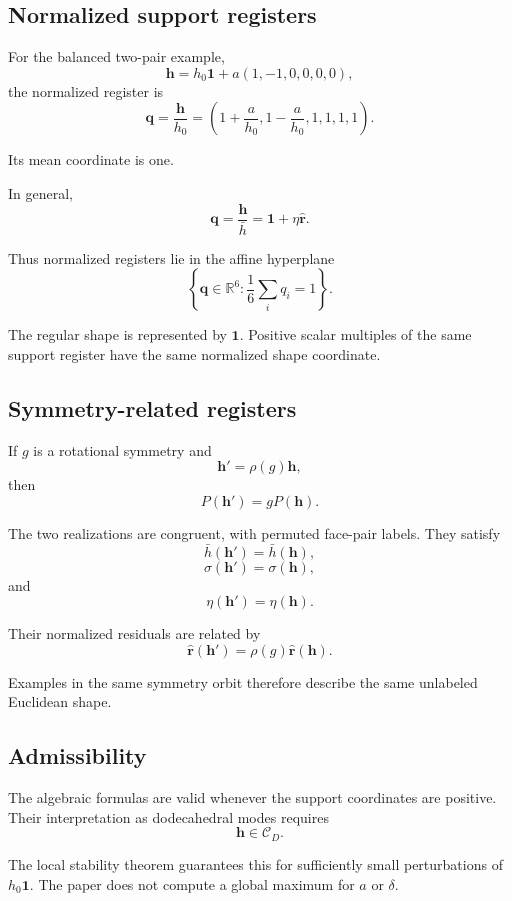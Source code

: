 \subsection{Normalized support registers}

For the balanced two-pair example,
\[
\mathbf h
=
h_0\mathbf 1+a(1,-1,0,0,0,0),
\]
the normalized register is
\[
\mathbf q
=
\frac{\mathbf h}{h_0}
=
\left(
1+\frac{a}{h_0},
1-\frac{a}{h_0},
1,1,1,1
\right).
\]

Its mean coordinate is one.

In general,
\[
\mathbf q
=
\frac{\mathbf h}{\bar h}
=
\mathbf 1+\eta\widehat{\mathbf r}.
\]

Thus normalized registers lie in the affine hyperplane
\[
\left\{
\mathbf q\in\mathbb R^6:
\frac{1}{6}\sum_i q_i=1
\right\}.
\]

The regular shape is represented by \(\mathbf 1\). Positive scalar multiples
of the same support register have the same normalized shape coordinate.

\subsection{Symmetry-related registers}

If \(g\) is a rotational symmetry and
\[
\mathbf h'=\rho(g)\mathbf h,
\]
then
\[
P(\mathbf h')=gP(\mathbf h).
\]

The two realizations are congruent, with permuted face-pair labels. They
satisfy
\[
\bar h(\mathbf h')=\bar h(\mathbf h),
\]
\[
\sigma(\mathbf h')=\sigma(\mathbf h),
\]
and
\[
\eta(\mathbf h')=\eta(\mathbf h).
\]

Their normalized residuals are related by
\[
\widehat{\mathbf r}(\mathbf h')
=
\rho(g)\widehat{\mathbf r}(\mathbf h).
\]

Examples in the same symmetry orbit therefore describe the same unlabeled
Euclidean shape.

\subsection{Admissibility}

The algebraic formulas are valid whenever the support coordinates are
positive. Their interpretation as dodecahedral modes requires
\[
\mathbf h\in\mathcal C_D.
\]

The local stability theorem guarantees this for sufficiently small
perturbations of \(h_0\mathbf 1\). The paper does not compute a global
maximum for \(a\) or \(\delta\).


